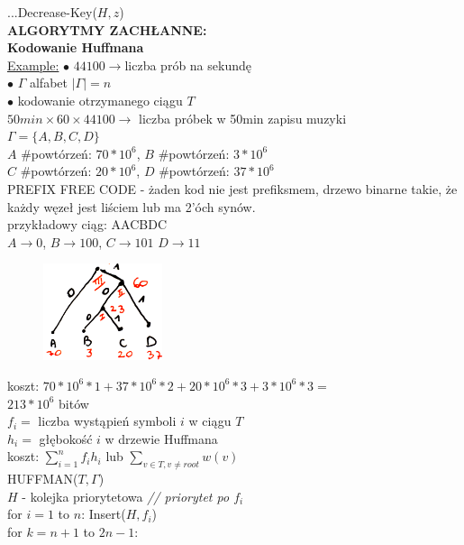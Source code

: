 \documentclass[8pt,a3paper]{article}
\begin{document}
\begin{multicols*}{3}
	 .\quad .\quad .\quad Decrease-Key($H,z$)\\
	 \textbf{ALGORYTMY ZACHŁANNE:} \\
	 \textbf{Kodowanie Huffmana} \\
	 \underline{Example:}
	 $\bullet$ $ 44 100 \to $liczba prób na sekundę\\
	 $\bullet$ $\Gamma$  alfabet $|\Gamma|=n$ \\
	 $\bullet$ kodowanie otrzymanego ciągu $T$ \\
	 $50min\times60\times44100 \to$ liczba próbek w 50min zapisu muzyki \\
	 $\Gamma=\{A,B,C,D\}$ \\
	 $A$ $\#$powtórzeń: $70*10^6$, $B$ $\#$powtórzeń: $3*10^6$ \\
	 $C$ $\#$powtórzeń: $20*10^6$, $D$ $\#$powtórzeń: $37*10^6$ \\
	 PREFIX FREE CODE - żaden kod nie jest prefiksmem, drzewo binarne takie, że każdy węzeł jest liściem lub ma 2'óch synów. \\
	 przykładowy ciąg: AACBDC\\
	 $A\to0$, $B\to100$, $C\to101$ $D\to11$ \\
	 \vspace{-0.75cm}
	 \begin{figure}[H]
 	 	\centering
 	 	\includegraphics[width=3.5cm]{huffman.PNG}
	 \end{figure}
	 \vspace{-0.6cm}
	 koszt: $70*10^6*1 + 37*10^6*2+20*10^6*3+3*10^6*3 =$ \\ $ 213*10^6$ bitów\\
	 $f_{i} =$ liczba wystąpień symboli $i$ w ciągu $T$ \\
	 $h_{i} =$ głębokość $i$ w drzewie Huffmana\\
	 koszt: $\sum_{i=1}^{n}f_{i}h_{i}$ lub $\sum_{v \in T,v\neq root}w(v)$\\
	 HUFFMAN($T,\Gamma$) \\
	 $H$ - kolejka priorytetowa \textit{// priorytet po $f_{i}$}\\
	 for $i=1$ to $n$: Insert($H,f_{i}$)\\
	 for $k=n+1$ to $2n-1$:\\

\end{multicols*}
\end{document}
